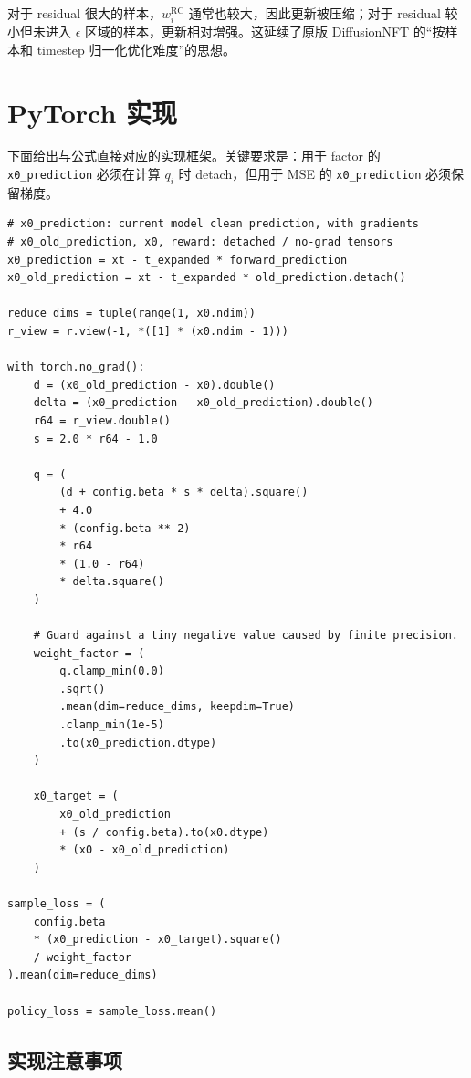 \documentclass[11pt,a4paper]{article}
\newcommand{\eps}{\epsilon}
\newcommand{\R}{\mathrm{RC}}
\begin{document}
对于 residual 很大的样本，$w_i^{\R}$ 通常也较大，因此更新被压缩；对于
residual 较小但未进入 $\eps$ 区域的样本，更新相对增强。这延续了原版
DiffusionNFT 的“按样本和 timestep 归一化优化难度”的思想。

\section{PyTorch 实现}

下面给出与公式直接对应的实现框架。关键要求是：用于 factor 的
\texttt{x0\_prediction} 必须在计算 $q_i$ 时 detach，但用于 MSE 的
\texttt{x0\_prediction} 必须保留梯度。

\begin{lstlisting}[style=pythonstyle]
# x0_prediction: current model clean prediction, with gradients
# x0_old_prediction, x0, reward: detached / no-grad tensors
x0_prediction = xt - t_expanded * forward_prediction
x0_old_prediction = xt - t_expanded * old_prediction.detach()

reduce_dims = tuple(range(1, x0.ndim))
r_view = r.view(-1, *([1] * (x0.ndim - 1)))

with torch.no_grad():
    d = (x0_old_prediction - x0).double()
    delta = (x0_prediction - x0_old_prediction).double()
    r64 = r_view.double()
    s = 2.0 * r64 - 1.0

    q = (
        (d + config.beta * s * delta).square()
        + 4.0
        * (config.beta ** 2)
        * r64
        * (1.0 - r64)
        * delta.square()
    )

    # Guard against a tiny negative value caused by finite precision.
    weight_factor = (
        q.clamp_min(0.0)
        .sqrt()
        .mean(dim=reduce_dims, keepdim=True)
        .clamp_min(1e-5)
        .to(x0_prediction.dtype)
    )

    x0_target = (
        x0_old_prediction
        + (s / config.beta).to(x0.dtype)
        * (x0 - x0_old_prediction)
    )

sample_loss = (
    config.beta
    * (x0_prediction - x0_target).square()
    / weight_factor
).mean(dim=reduce_dims)

policy_loss = sample_loss.mean()
\end{lstlisting}

\subsection{实现注意事项}
\end{document}

